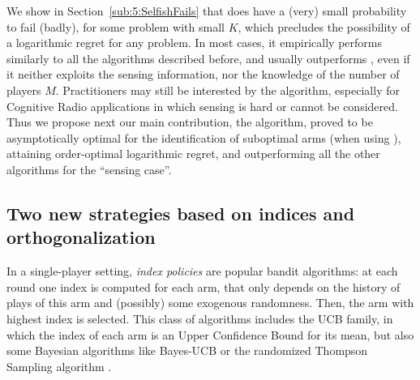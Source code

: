 We show in Section~\ref{sub:5:SelfishFails} that \Selfish{} does have a (very) small probability to fail (badly), for some problem with small $K$,
which precludes the possibility of a logarithmic regret for any problem.
In most cases, it empirically performs similarly to all the algorithms described before,
and usually outperforms \rhoRand,
even if it neither exploits the sensing information, nor the knowledge of the number of players $M$.
%
Practitioners may still be interested by the algorithm, especially for Cognitive Radio applications in which sensing is hard or cannot be considered.
Thus we propose next our main contribution, the \MCTopM{} algorithm, proved to be asymptotically optimal for the identification of suboptimal arms (when using \klUCB), attaining order-optimal logarithmic regret, and outperforming all the other algorithms for the ``sensing case''.



\subsection{Two new strategies based on indices and orthogonalization}
\label{sub:5:RandTopM_and_MCTopM}


In a single-player setting, \emph{index policies} are popular bandit algorithms: at each round one index is computed for each arm, that only depends on the history of plays of this arm and (possibly) some exogenous randomness. Then, the arm with highest index is selected. This class of algorithms includes the UCB family, in which the index of each arm is an Upper Confidence Bound for its mean, but also some Bayesian algorithms like Bayes-UCB \citep{Kaufmann12BUCB} or the randomized Thompson Sampling algorithm \citep{Thompson33,AgrawalGoyal11,Kaufmann12Thompson}.



